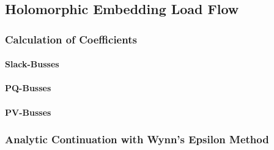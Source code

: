 \subsection{Holomorphic Embedding Load Flow}
\label{sec:helm}

\subsubsection{Calculation of Coefficients}

\paragraph{Slack-Busses}

\paragraph{PQ-Busses}

\paragraph{PV-Busses}

\subsubsection{Analytic Continuation with Wynn's Epsilon Method}
